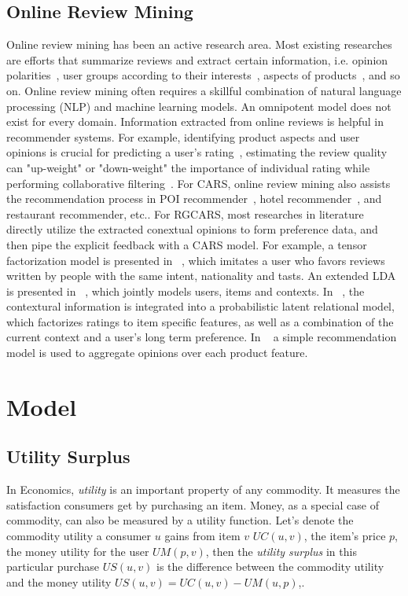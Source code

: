 \documentclass{llncs}
\begin{document}
\subsection{Online Review Mining}
Online review mining has been an active research area. Most existing researches are efforts that summarize reviews and extract certain information, i.e. opinion polarities~\cite{Liu2005Opinion}, user groups according to their interests~\cite{Si2014Users}, aspects of products~\cite{Moghaddam2013FLDA}, and so on. Online review mining often requires a skillful combination of natural language processing (NLP) and machine learning models. An omnipotent model does not exist for every domain.
Information extracted from online reviews is helpful in recommender systems. For example, identifying product aspects and user opinions is crucial for predicting a user's rating~\cite{Qu2010Bag}, estimating the review quality can "up-weight" or "down-weight" the importance of individual rating while performing collaborative filtering~\cite{Raghavan2012Review}. For CARS, online review mining also assists the recommendation process in POI recommender~\cite{Biancalana2013Approach}, hotel recommender~\cite{Levi2012Finding}, and restaurant recommender\cite{Li2010Contextual}, etc..
For RGCARS, most researches in literature directly utilize the extracted conextual opinions to form preference data, and then pipe the explicit feedback with a CARS model. For example, a tensor factorization model is presented in ~\cite{Levi2012Finding}, which imitates a user who favors reviews written by people with the same intent, nationality and tasts. An extended LDA is presented in ~\cite{Hariri2013Query}, which jointly models users, items and contexts. In ~\cite{Li2010Contextual}, the contextural information is integrated into a probabilistic latent relational model, which factorizes ratings to item specific features, as well as a combination of the current context and a user's long term preference. In ~\cite{Liu2013Combining} a simple recommendation model is used to aggregate opinions over each product feature.


\section{ Model}\label{sec:mnar}
\subsection{Utility Surplus}
In Economics, {\em utility} is an important property of any commodity. It measures the satisfaction consumers get by purchasing an item. Money, as a special case of commodity, can also be measured by a utility function. Let's denote the commodity utility a consumer $u$ gains from item $v$ $UC(u,v)$, the item's price $p$, the money utility for the user $UM(p,v)$,  then the {\em utility surplus} in this particular purchase $US(u,v)$ is the difference between the commodity utility and the money utility  $US(u,v)=UC(u,v)-UM(u,p)$,.
\end{document}
